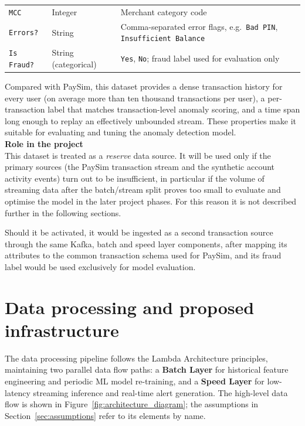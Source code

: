 \documentclass[titlepage]{article}
\begin{document}
\begin{table}[H]
\begin{tabularx}{\textwidth}{@{}l l X@{}}
        \addlinespace

        \texttt{MCC} & Integer & Merchant category code \\

        \addlinespace

        \texttt{Errors?} & String & Comma-separated error flags, e.g.\ \texttt{Bad PIN}, \texttt{Insufficient Balance} \\

        \addlinespace

        \texttt{Is Fraud?} & String (categorical) & \texttt{Yes}, \texttt{No}; fraud label used for evaluation only \\

        \bottomrule
    \end{tabularx}
\end{table}

Compared with PaySim, this dataset provides a dense transaction history for every user (on average more than ten 
thousand transactions per user), a per-transaction label that matches transaction-level anomaly scoring, and a time 
span long enough to replay an effectively unbounded stream. These properties make it suitable for evaluating and 
tuning the anomaly detection model.\\

\noindent \textbf{Role in the project}\\
This dataset is treated as a \emph{reserve} data source. It will be used only if the primary sources (the PaySim transaction stream and the synthetic account activity events) turn out to be insufficient,  in particular if the volume of streaming data after the batch/stream split proves too small to evaluate and optimise the model in the later project phases. For this reason it is not described further in the following sections.

Should it be activated, it would be ingested as a second transaction source through the same Kafka, batch and speed layer components, after mapping its 
attributes to the common transaction schema used for PaySim, and its fraud label would be used exclusively for model
evaluation.

\section{Data processing and proposed infrastructure}
The data processing pipeline follows the Lambda Architecture principles, maintaining two parallel data flow paths: 
a \textbf{Batch Layer} for historical feature engineering and periodic ML model re-training, and a \textbf{Speed Layer} 
for low-latency streaming inference and real-time alert generation. The high-level data flow is shown in Figure~\ref{fig:architecture_diagram}; the assumptions in Section~\ref{sec:assumptions} refer to its elements by name.
\end{document}

